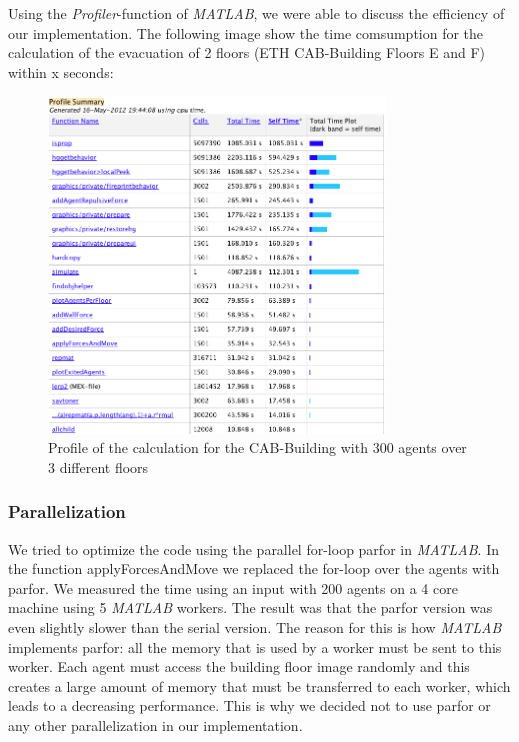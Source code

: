 \documentclass[11pt]{article}
\begin{document}


Using the \textit{Profiler}-function of \textit{MATLAB}, we were able to discuss the efficiency of our implementation. The following image show the time comsumption for the calculation of the evacuation of 2 floors (ETH CAB-Building Floors E and F) within x seconds:

\begin{figure}[h]
\centering
\includegraphics[width=0.8\textwidth]{./images/profiler.png}
\caption{Profile of the calculation for the CAB-Building with 300 agents over 3 different floors} 
\label{cab profile}
\end{figure}


\subsubsection{Parallelization}

We tried to optimize the code using the parallel for-loop parfor in \textit{MATLAB}. In
the function applyForcesAndMove we replaced the for-loop over the agents with
parfor. We measured the time using an input with 200 agents on a 4 core machine
using 5 \textit{MATLAB} workers. The result was that the parfor version was even slightly
slower than the serial version. The reason for this is how \textit{MATLAB} implements
parfor: all the memory that is used by a worker must be sent to this worker.
Each agent must access the building floor image randomly and this creates a
large amount of memory that must be transferred to each worker, which leads to a
decreasing performance.
This is why we decided not to use parfor or any other parallelization in our
implementation.
\end{document}

